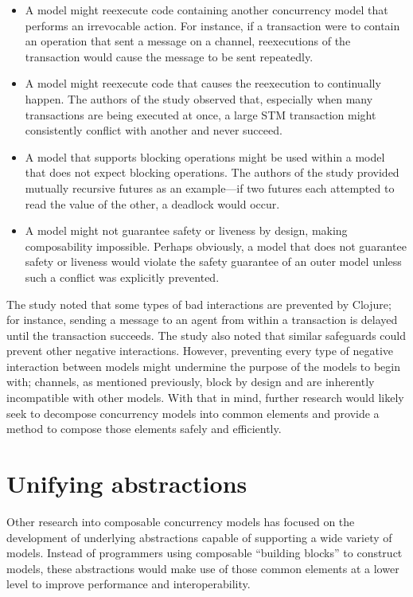 \documentclass{sig-alternate}
\begin{document}
\begin{itemize}
  \item A model might reexecute code containing another concurrency model that performs an irrevocable action. For instance, if a transaction were to contain an operation that sent a message on a channel, reexecutions of the transaction would cause the message to be sent repeatedly.

  \item A model might reexecute code that causes the reexecution to continually happen. The authors of the study observed that, especially when many transactions are being executed at once, a large STM transaction might consistently conflict with another and never succeed.

  \item A model that supports blocking operations might be used within a model that does not expect blocking operations. The authors of the study provided mutually recursive futures as an example---if two futures each attempted to read the value of the other, a deadlock would occur.

  \item A model might not guarantee safety or liveness by design, making composability impossible. Perhaps obviously, a model that does not guarantee safety or liveness would violate the safety guarantee of an outer model unless such a conflict was explicitly prevented.
\end{itemize}

The study noted that some types of bad interactions are prevented by Clojure; for instance, sending a message to an agent from within a transaction is delayed until the transaction succeeds. The study also noted that similar safeguards could prevent other negative interactions. However, preventing every type of negative interaction between models might undermine the purpose of the models to begin with; channels, as mentioned previously, block by design and are inherently incompatible with other models. With that in mind, further research would likely seek to decompose concurrency models into common elements and provide a method to compose those elements safely and efficiently.

\section{Unifying abstractions}

Other research into composable concurrency models has focused on the development of underlying abstractions capable of supporting a wide variety of models. Instead of programmers using composable ``building blocks'' to construct models, these abstractions would make use of those common elements at a lower level to improve performance and interoperability.
\end{document}

